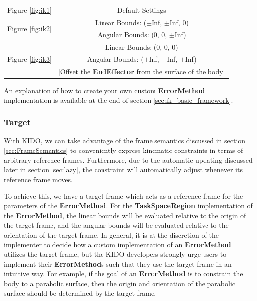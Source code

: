 \begin{tabular}{| l | c |}
  \hline
  \multirow{2}{*}{Figure \ref{fig:ik1}} & \multirow{2}{*}{Default Settings}              \\
                                        &                                                \\ \hline
  \multirow{2}{*}{Figure \ref{fig:ik2}} & Linear Bounds: ($\pm$Inf, $\pm$Inf, 0)         \\
                                        & Angular Bounds: (0, 0, $\pm$Inf)               \\ \hline
  \multirow{3}{*}{Figure \ref{fig:ik3}} & Linear Bounds: (0, 0, 0)                       \\
                                        & Angular Bounds: ($\pm$Inf, $\pm$Inf, $\pm$Inf) \\
                                        & [Offset the \textbf{EndEffector} from the surface of the body]     \\ \hline
\end{tabular}

An explanation of how to create your own custom \textbf{ErrorMethod} implementation is available at the end of section \ref{sec:ik_basic_framework}.

\subsubsection{Target}

With KIDO, we can take advantage of the frame semantics discussed in section \ref{sec:FrameSemantics} to conveniently express kinematic constraints in terms of arbitrary reference frames. Furthermore, due to the automatic updating discussed later in section \ref{sec:lazy}, the constraint will automatically adjust whenever its reference frame moves.

To achieve this, we have a target frame which acts as a reference frame for the parameters of the \textbf{ErrorMethod}. For the \textbf{TaskSpaceRegion} implementation of the \textbf{ErrorMethod}, the linear bounds will be evaluated relative to the origin of the target frame, and the angular bounds will be evaluated relative to the orientation of the target frame. In general, it is at the discretion of the implementer to decide how a custom implementation of an \textbf{ErrorMethod} utilizes the target frame, but the KIDO developers strongly urge users to implement their \textbf{ErrorMethod}s such that they use the target frame in an intuitive way. For example, if the goal of an \textbf{ErrorMethod} is to constrain the body to a parabolic surface, then the origin and orientation of the parabolic surface should be determined by the target frame.

